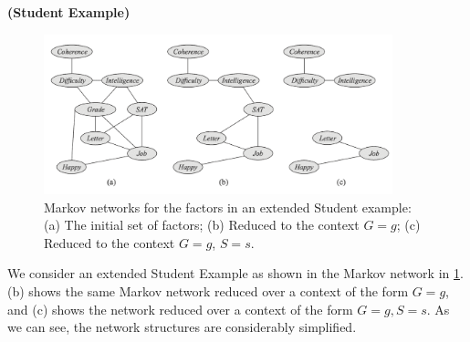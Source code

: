 \documentclass{article}
\newcommand{\bfs}[1]{\textbf{({#1}) }}
\begin{document}
\begin{exma}\bfs{Student Example} 
\begin{figure}[H]
    \centering
    \includegraphics[width=0.9\textwidth]{Figs/a17.png}
    \caption{Markov networks for the factors in an extended Student example: (a) The initial set of factors; (b) Reduced to the context $G = g$; (c) Reduced to the context $G = g$, $S = s$.}
    \label{fig:qwevcc}
\end{figure}
We consider an extended Student Example as shown in the Markov network in \cref{fig:qwevcc}. (b) shows the same Markov network reduced over a context of the form $G=g$, and (c) shows the network reduced over a context of the form $G=g, S=s$. As we can see, the network structures are considerably simplified.
\end{exma}
\end{document}
